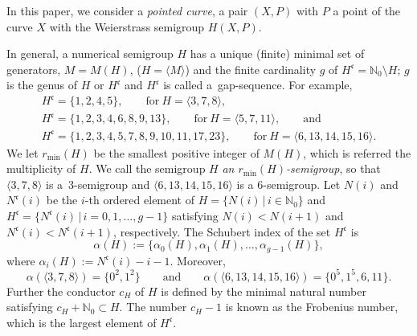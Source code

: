 \documentclass[pdftex]{sigma}
\def\NN{{\mathbb N}}
\def\fc{{\mathfrak c}}
\numberwithin{equation}{section}
\begin{document}
In this paper, we consider a \emph{pointed curve}, a pair $(X,P)$ with $P$ a point of the curve $X$ with the Weierstrass semigroup $H(X,P)$.

In general, a numerical semigroup $H$ has a unique (finite) minimal set of generators, $M=M(H)$, ($H=\langle M\rangle$) and the finite cardinality $g$ of $H^\fc=\NN_0\setminus H$; $g$ is the genus of $H$ or $H^\fc$ and $H^\fc$ is called a~gap-sequence.
For example,
\begin{gather*}
H^\fc=\{1, 2, 4, 5\}, \qquad \text{for} \ H=\langle 3,7,8\rangle, \\
H^\fc=\{1,2,3,4,6,8,9,13\}, \qquad \text{for} \ H=\langle 5,7,11\rangle,\qquad
\text{and} \\
H^\fc=
\{1,2,3,4,5,7,8,9,10,11,17,23\}, \qquad \text{for}
\ H=\langle6,13,14,15,16\rangle.
\end{gather*}
We let $r_{\min}(H)$ be the smallest positive integer of $M(H)$, which is referred the multiplicity of $H$.
We call the semigroup $H$ \emph{an $r_{\min}(H)$-semigroup}, so that $\langle 3,7,8\rangle$ is a~$3$-semigroup and $\langle 6,13,14,15,16\rangle$ is a $6$-semigroup.
Let $N(i)$ and $N^\fc(i)$ be the $i$-th ordered element of $H=\{N(i)\, |\, i \in \NN_0\}$ and $H^\fc=\{N^\fc(i)\, |\, i = 0, 1, \dots, g-1\}$ satisfying $N(i) < N(i+1)$ and $N^\fc(i) < N^\fc(i+1)$, respectively.
The Schubert index of the set $H^\fc$ is
\begin{equation*}
\alpha(H) :=\{\alpha_0(H), \alpha_1(H), \dots, \alpha_{g-1}(H)\},%
\end{equation*}
where $\alpha_i(H) := N^\fc(i) - i -1$.
Moreover,
\[
\alpha(\langle 3,7,8\rangle) =\big\{0^2, 1^2\big\}
\qquad\text{and}\qquad
\alpha(\langle 6,13,14,15,16\rangle) =\big\{0^5, 1^5, 6, 11\big\}.
\]
Further the conductor $c_H$ of $H$ is defined by the minimal natural number satisfying ${c_H + \NN_0 \subset H}$.
The number $c_H-1$ is known as the Frobenius number, which is the largest element of $H^\fc$.
\end{document}
